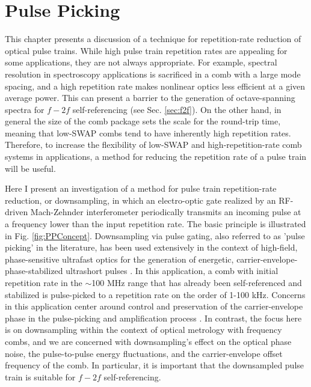  \chapter{Pulse Picking} \label{chap:PulsePicking}
 

This chapter presents a discussion of a technique for repetition-rate reduction of optical pulse trains. While high pulse train repetition rates are appealing for some applications, they are not always appropriate. For example, spectral resolution in spectroscopy applications is sacrificed in a comb with a large mode spacing, and a high repetition rate makes nonlinear optics less efficient at a given average power. This can present a barrier to the generation of octave-spanning spectra for $f-2f$ self-referencing (see Sec. \ref{sec:f2f}). On the other hand, in general the size of the comb package sets the scale for the round-trip time, meaning that low-SWAP combs tend to have inherently high repetition rates. Therefore, to increase the flexibility of low-SWAP and high-repetition-rate comb systems in applications, a method for reducing the repetition rate of a pulse train will be useful.

Here I present an investigation of a method for pulse train repetition-rate reduction, or downsampling, in which an electro-optic gate realized by an RF-driven Mach-Zehnder interferometer periodically transmits an incoming pulse at a frequency lower than the input repetition rate. The basic principle is illustrated in Fig. \ref{fig:PPConcept}. Downsampling via pulse gating, also referred to as 'pulse picking' in the literature, has been used extensively in the context of high-field, phase-sensitive ultrafast optics for the generation of energetic, carrier-envelope-phase-stabilized ultrashort pulses \cite{Backus1998,Baltuska2003}. In this application, a comb with initial repetition rate in the $\sim$100 MHz range that has already been self-referenced and stabilized is pulse-picked to a repetition rate on the order of 1-100 kHz. Concerns in this application center around control and preservation of the carrier-envelope phase in the pulse-picking and amplification process \cite{Gohle2005,Rauschenberger2006}. In contrast, the focus here is on downsampling within the context of optical metrology with frequency combs, and we are concerned with downsampling's effect on the optical phase noise, the pulse-to-pulse energy fluctuations, and the carrier-envelope offset frequency of the comb. In particular, it is important that the downsampled pulse train is suitable for $f-2f$ self-referencing. 

